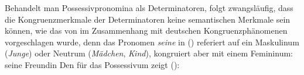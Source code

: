 Behandelt man Possessivpronomina als Determinatoren, folgt zwangsläufig, dass die Kongruenzmerkmale
der Determinatoren keine semantischen Merkmale sein können, wie das \zb von \citet[]{ps2}
im Zusammenhang mit deutschen Kongruenzphänomenen vorgeschlagen wurde, 
denn das Pronomen \emph{seine} in () referiert auf ein Maskulinum (\emph{Junge}) oder Neutrum
(\emph{Mädchen}, \emph{Kind}), kongruiert aber mit einem Femininum:
\largerpage[2]
\ea
seine Freundin
\z
Den \localw für das Possessivum zeigt ():
\eas
\label{le-seine-agr}%
